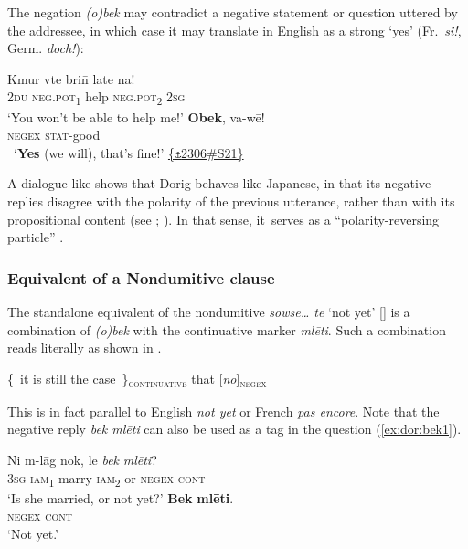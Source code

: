 \documentclass[output=paper,colorlinks,citecolor=brown,draft]{langscibook}
\begin{document}
The negation \textit{(o)bek} may contradict a negative statement or question uttered by the addressee, in which case it may translate in English as a strong ‘yes’ (Fr.~\textit{si!}, Germ. \textit{doch!}):

\ea\label{ex:dor:nono}
    \begin{xlist}
    \label{ex:dor:nono1}
        \gll   Kmur vte bri\={n} late na! \\ 
              \textsc{2du} \textsc{neg.pot\textsubscript{1}} help \textsc{neg.pot\textsubscript{2}} \textsc{2sg}\\ 
        \glt ‘You won’t be able to help me!'
    \label{ex:dor:nono2}
        \gll  \textbf{Obek}, va-wē!\\ 
               \textsc{negex} \textsc{stat-}good\\\
        \glt ‘\textbf{Yes} (we will), that’s fine!’ \quad \href{https://doi.org/10.24397/pangloss-0002306#S21}{\{\texttt{⚓}2306\#S21\}}
    \end{xlist}
\z



\noindent A dialogue like  shows that Dorig behaves like Japanese, in that its negative replies disagree with the polarity of the previous utterance, rather than with its propositional content (see \citealt{Holmberg2015}; \citealt{Miestamo2017}). In that sense, it~serves as a “polarity-reversing particle” \citep[23]{Moser2018}.

\subsubsection{Equivalent of a Nondumitive clause}
\label{sec:dor:3.1.2}\label{bkm:Ref66558480}
The standalone equivalent of the nondumitive \textit{sowse… te} ‘not yet’ [] is a combination of \textit{(o)bek} with the continuative marker \textit{mlēti}. 
Such a combination reads literally as shown in \REF{ex:dor:it is still the case}.


\ea\label{ex:dor:it is still the case}
\{~it is still the case~\}\textsc{\textsubscript{continuative}} that [\textit{no}]\textsc{\textsubscript{negex}} 
\z

\noindent This is in fact parallel to English \textit{not yet} or French \textit{pas encore}.
Note that the negative reply \textit{bek mlēti} can also be used as a tag in the question (\ref{ex:dor:bek1}).

\ea\label{ex:dor:bek}
    \begin{xlist}
    \label{ex:dor:bek1}
        \gll  Ni m-lāg nok, le \textit{bek} \textit{mlēti}?\\ 
          \textsc{3sg} \textsc{iam\textsubscript{1}}-marry \textsc{iam\textsubscript{2}} or \textsc{negex} \textsc{cont}\\ 
        \glt ‘Is she married, or not yet?' 
    \label{ex:dor:bek2}
        \gll  \textbf{Bek} \textbf{mlēti}.\\ 
                \textsc{negex} \textsc{cont}\\
        \glt ‘Not yet.’   
    \end{xlist}
\z 
\end{document}
